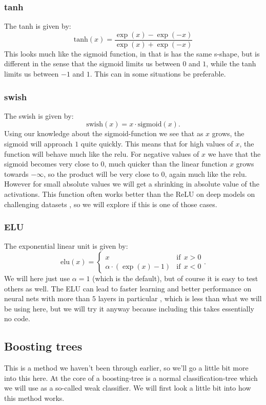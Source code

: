 \documentclass{article}
\begin{document}
\subsubsection{tanh}
The tanh is given by:
$$\text{tanh}(x) = \frac{\exp(x) - \exp(-x)}{\exp(x) + \exp(-x)}$$ \cite{wikihyperbolicfunctions}
This looks much like the sigmoid function, in that is has the same s-shape, but
is different in the sense that the sigmoid limits us between $0$ and $1$, while
the tanh limits us between $-1$ and $1$. This can in some situations be
preferable.

\subsubsection{swish}
The swish is given by:
$$\text{swish}(x) = x \cdot \text{sigmoid}(x).$$ \cite{tensorflowdocswish}
Using our knowledge about the sigmoid-function we see that as $x$ grows, the
sigmoid will approach $1$ quite quickly. This means that for high values of
$x$, the function will behave much like the relu. For negative values of $x$ we
have that the sigmoid becomes very close to $0$, much quicker than the linear
function $x$ grows towards $-\infty$, so the product will be very close to $0$,
again much like the relu. However for small absolute values we will get a
shrinking in absolute value of the activations. This function often works
better than the ReLU on deep models on challenging datasets
\cite{ramachandran2017searching}, so we will explore if this is one of those
cases.

\subsubsection{ELU}
The exponential linear unit is given by:
$$\text{elu}(x) = \begin{cases} x \qquad \qquad & \text{if}\ \ x > 0 \\ \alpha \cdot (\exp(x) - 1) & \text{if}\ \ x < 0 \end{cases}.$$ \cite{tensorflowdocelu}
We will here just use $\alpha = 1$ (which is the default), but of course it is
easy to test others as well. The ELU can lead to faster learning and better
performance on neural nets with more than $5$ layers in particular
\cite{clevert2016fast}, which is less than what we will be using here,
but we will try it anyway because including this takes essentially no code.

\subsection{Boosting trees}
This is a method we haven't been through earlier, so we'll go a little bit more
into this here. At the core of a boosting-tree is a normal classification-tree
which we will use as a so-called weak classifier. We will first look a little bit into how this method works.
\end{document}

